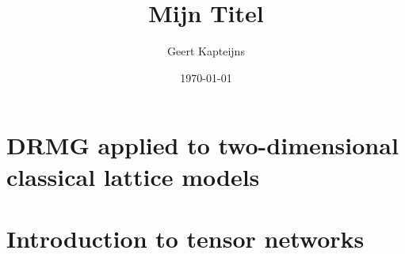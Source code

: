\documentclass[9pt, ebook, openany, oneside]{memoir}
\renewcommand{\afterchaptertitle}{%
 \vskip2em
 \hrule height 0.6pt
 \vskip2em
 }
\begin{document}
\pagestyle{simple}



\frontmatter

\title{Mijn Titel}
\author{Geert Kapteijns}
\date{\today}


\begingroup
\renewcommand{\afterchaptertitle}{\vskip1.5em}

\tableofcontents*
\endgroup

\mainmatter

% 

%

% 

\chapter{DRMG applied to two-dimensional classical lattice models}


% 



% 
%
\chapter{Introduction to tensor networks}



\backmatter
\printbibliography
\end{document}
